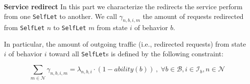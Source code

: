 \documentclass[11pt]{amsart}
\newcommand{\slet}{\texttt{SelfLet}}
\newcommand{\moreslet}{\texttt{SelfLet}s}
\begin{document}
\begin{comment}
Request rate for state $i$ of \slet{} $n$, for behavior $b$ of service $s$ is a function of the behavior structure (i.e., only a fraction of requests goes to state $i$):
$$
\mbox{{\boldmath $\Lambda$}}_n^{b,s} = \mathbf{P}_b \cdot \mbox{{\boldmath $\Lambda$}}_n^{b,s} + \Lambda_n^s \cdot \mathbf{e_1}
$$

Contribution to utilization for state $i$ in behavior $b$ of service $s$ for \slet{} $n$. 
$$
U_{i,n} ^{b,s} = D_{n,i} \cdot \lambda_{i,n}^{b,s}
$$


The total utilization for \slet{} $n$ is given by summing up all utilization contributions of each state of behaviors:

$$
U_n = \sum_{s}\sum_{b}\sum_{i} U_{i,n} ^{b,s} \cdot z_{n,s,b} < 1
$$



where $\lambda_{n,i,m}$ is execution frequency for state $i$ from \slet{} $n$ toward \slet{} $m$ (states are unique among \moreslet{}).

$$
\sum_{m} \lambda_{n,i,m} = \lambda_{i,n}
$$

where $\lambda_{i,n}$ is the frequency of execution of state $i$ for \slet{} $n$.

There is also another way to express that constraint (i.e., considering internal behavior states):
$$
\lambda_{i,n} = \sum_{s}\sum_{b} \lambda_{i,n} ^{b,s}
$$ 

$$\lambda_{i,n} \leq M \cdot ( x_{n,i} + w_{n,i})$$

Cumulative request rate for service $s$ over all \moreslet{}:
$$
\sum_{n} \Lambda_{n}^s = \Lambda^s
$$

Requests for service $s$ are forwarded toward a \slet{} only if that \slet{} is running it:
$$
\Lambda_n^s  \leq \Lambda^s \cdot y_{n,s}
$$
\end{comment}


{\bf Service redirect}
In this part we characterize the redirects the service perform from one \slet{} to another. We call $\gamma_{n, b, i, m}$ the amount of requests redirected from \slet{} $n$ to \slet{} $m$ from state $i$ of behavior $b$.

In particular, the amount of outgoing traffic (i.e., redirected requests) from state $i$ of behavior $i$ toward all \moreslet{} is defined by the following constraint:

$$
	\sum_{m \in \mathcal{N}} \gamma_{n, b, i, m} = \lambda_{n,b,i} \cdot (1 - ability(b)) \:, \; \forall b \in \mathcal{B}, i \in \mathcal{I}_b, n \in \mathcal{N}
$$
\end{document}
